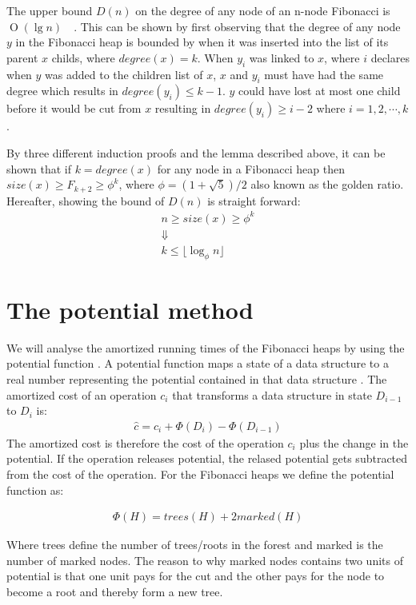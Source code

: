 \documentclass[oneside,11pt,openright]{report}
\newcommand{\BigO}[1]{\ensuremath{\operatorname{O}\left(#1\right)}}
\begin{document}
The upper bound $D(n)$ on the degree of any node of an n-node Fibonacci is $\BigO{\lg n}$~\cite[p.~523]{ITA09}~\cite[p.~604]{FT87}. This can be shown by first observing that the degree of any node $y$ in the Fibonacci heap is bounded by when it was inserted into the list of its parent $x$ childs, where $degree(x) = k$. When $y_i$ was linked to $x$, where $i$ declares when $y$ was added to the children list of $x$, $x$ and $y_i$ must have had the same degree which results in $degree(y_i) \le k - 1$. $y$ could have lost at most one child before it would be cut from $x$ resulting in $degree(y_i) \ge i - 2$ where $i = 1,2,\cdots,k$.

By three different induction proofs and the lemma described above, it can be shown that if $k = degree(x)$ for any node in a Fibonacci heap then $size(x) \ge F_{k+2} \ge \phi^k$, where $\phi = (1+\sqrt{5}) / 2$ also known as the golden ratio. Hereafter, showing the bound of $D(n)$ is straight forward:
\begin{gather*}
    n \ge size(x) \ge \phi^k \\
    \Downarrow \\
    k \le \lfloor \log_\phi n \rfloor    
\end{gather*}

\section{The potential method}

We will analyse the amortized running times of the Fibonacci heaps by using the potential function \cite[p.~215]{FT87}. A potential function maps a state of a data structure to a real number representing the potential contained in that data structure \cite[p.~459]{ITA09}. The amortized cost of an operation $c_i$ that transforms a data structure in state $D_{i-1}$ to $D_{i}$ is:
\begin{align*}
    \hat{c} = c_i + \Phi(D_i) - \Phi(D_{i-1})
\end{align*}
The amortized cost is therefore the cost of the operation $c_i$ plus the change in the potential. If the operation releases potential, the relased potential gets subtracted from the cost of the operation. For the Fibonacci heaps we define the potential function as:

\begin{align*}
    \Phi(H) = trees(H) + 2marked(H)
\end{align*}

Where trees define the number of trees/roots in the forest and marked is the number of marked nodes. The reason to why marked nodes contains two units of potential is that one unit pays for the cut and the other pays for the node to become a root and thereby form a new tree.
\end{document}
